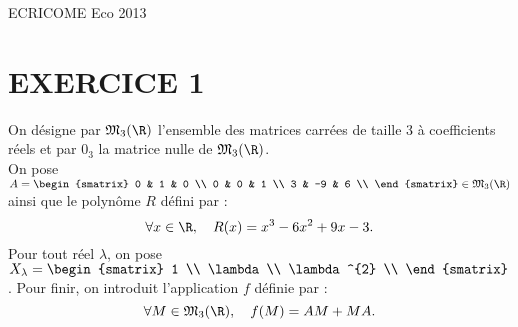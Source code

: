 \documentclass[11pt]{article}%
\begin{document}
\begin{center}
{\Huge ECRICOME Eco 2013}
\end{center}

\section*{EXERCICE 1}
\noindent On désigne par $\mathfrak{M}_{3} (\R)$ l'ensemble des
matrices carrées de taille 3 à coefficients réels et par $0_{3}$ la
matrice nulle de $\mathfrak{M}_{3}(\R)$. \\
On pose $A = \begin{smatrix}
0 & 1 & 0 \\
0 & 0 & 1 \\
3 & -9 & 6 \\
\end{smatrix}
\in \mathfrak{M}_{3}(\R)$ ainsi que le polynôme $R$ défini par : 
\[
 \forall x \in \R, \ \ \ R(x) = x^{3} - 6 x^{2} + 9 x - 3. 
\]
Pour tout réel $\lambda$, on pose $X_\lambda = \begin{smatrix}
1 \\
\lambda \\
\lambda^{2} \\
\end{smatrix}
$. Pour finir, on introduit l'application $f$ définie par : 
\[
 \forall M \in \mathfrak{M}_{3}(\R), \ \ \ f(M) = AM + MA.
\]
\end{document}
